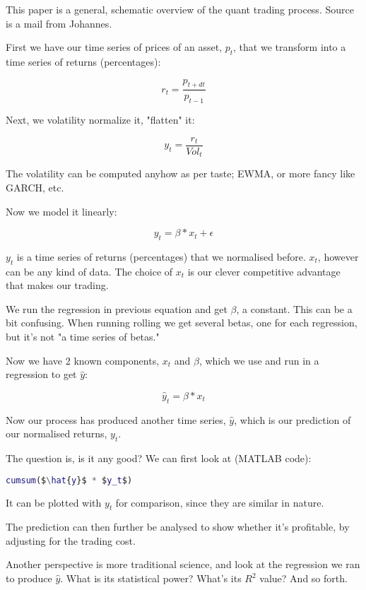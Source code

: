 \documentclass[a4paper]{article}
\title{\documenttitle}
\date{\today}
\author{Frans Englich \\
        \href{mailto:fenglich@fastmail.fm}{fenglich@fastmail.fm}}
\begin{document}
\maketitle

This paper is a general, schematic overview of the quant trading process. Source is a mail from Johannes.

First we have our time series of prices of an asset, $p_t$, that we transform into a time series of returns (percentages):

\begin{equation*}
    r_t = \frac{p_{t + dt}}{p_{t - 1}}
\end{equation*}

Next, we volatility normalize it, "flatten" it:

\begin{equation*}
    y_t = \frac{r_t}{Vol_t}
\end{equation*}

The volatility can be computed anyhow as per taste; EWMA, or more fancy like GARCH, etc.

Now we model it linearly:

\begin{equation*}
    y_t = \beta*x_t + \epsilon
\end{equation*}

$y_t$ is a time series of returns (percentages) that we normalised before. $x_t$, however can be any kind of data. The choice of $x_t$ is our clever competitive advantage that makes our trading.

We run the regression in previous equation and get $\beta$, a constant. This can be a bit confusing. When running rolling we get several betas, one for each regression, but it's not "a time series of betas."

Now we have 2 known components, $x_t$ and $\beta$, which we use and run in a regression to get $\hat{y}$:

\begin{equation*}
    \hat{y}_t = \beta*x_t   
\end{equation*}

Now our process has produced another time series, $\hat{y}$, which is our prediction of our normalised returns, $y_t$.

The question is, is it any good? We can first look at (MATLAB code):

\begin{lstlisting}[language=Matlab, mathescape=true]
cumsum($\hat{y}$ * $y_t$)
\end{lstlisting}

It can be plotted with $y_t$ for comparison, since they are similar in nature.

The prediction can then further be analysed to show whether it's profitable, by adjusting for the trading cost.

Another perspective is more traditional science, and look at the regression we ran to produce $\hat{y}$. What is its statistical power? What's its $R^2$ value? And so forth.
\end{document}
